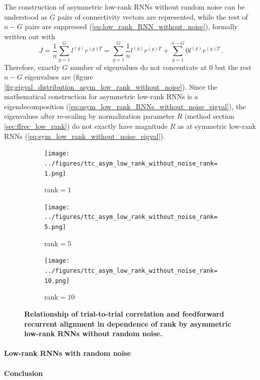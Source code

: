 \documentclass[11pt]{article}
\begin{document}
	The construction of asymmetric low-rank RNNs without random noise can be understood as $G$ pairs of connectivity vectors are represented, while the rest of $n-G$ pairs are suppressed (\ref{eq:low_rank_RNN_without_noise}), formally written out with
		\begin{equation} \label{eq:asym_low_rank_RNNs_without_noise_eigval}
			J = \frac{1}{n} \sum_{g=1}^{G} l^{(g)} r^{(g)T} = \sum_{g=1}^{G} \frac{1}{n} l^{(g)} r^{(g)T} + \sum_{g=1}^{n-G} 0 l^{(g)} r^{(g)T} \, .
		\end{equation}
	Therefore, exactly $G$ number of eigenvalues do not concentrate at $0$ but the rest $n-G$ eigenvalues are (figure \ref{fig:eigval_distribution_asym_low_rank_without_noise}). Since the mathematical construction for asymmetric low-rank RNNs is a eigendecomposition (\ref{eq:asym_low_rank_RNNs_without_noise_eigval}), the eigenvalues after re-scaling by normalization parameter $R$ (method section \ref{sec:ffrec_low_rank}) do not exactly have magnitude $R$ as at symmetric low-rank RNNs (\ref{eq:sym_low_rank_without_noise_eigval}).	
	
		\begin{figure}[H]
			\centering
			\begin{subfigure}[b]{0.3\textwidth}
				\texttt{[image: ../figures/ttc\_asym\_low\_rank\_without\_noise\_rank=1.png]}
				\caption{rank$=1$}
			\end{subfigure}
			\begin{subfigure}[b]{0.3\textwidth}
				\texttt{[image: ../figures/ttc\_asym\_low\_rank\_without\_noise\_rank=5.png]}
				\caption{rank$=5$}
			\end{subfigure}
			\begin{subfigure}[b]{0.3\textwidth}
				\texttt{[image: ../figures/ttc\_asym\_low\_rank\_without\_noise\_rank=10.png]}
				\caption{rank$=10$}
			\end{subfigure} 
		\caption{\textbf{Relationship of trial-to-trial correlation and feedforward recurrent alignment in dependence of rank by asymmetric low-rank RNNs without random noise.}}
		\end{figure}
	
	\paragraph{Low-rank RNNs with random noise}
	
	\paragraph{Conclusion}
	
\end{document}

